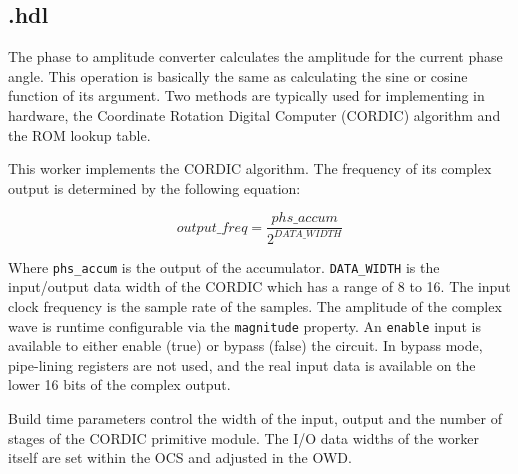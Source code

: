 \subsection*{\comp.hdl}
\begin{flushleft}
	The phase to amplitude converter calculates the amplitude for the current phase angle.  This operation is basically the same as calculating the sine or cosine function of its argument.  Two methods are typically used for implementing in hardware, the Coordinate Rotation Digital Computer (CORDIC) algorithm and the ROM lookup table.\medskip

	This worker implements the CORDIC algorithm. The frequency of its complex output is determined by the following equation:

	\begin{equation} \label{eq:output_freq}
		output\_freq = \frac{phs\_accum}{2^{DATA\_WIDTH}}
	\end{equation}

	Where \verb+phs_accum+ is the output of the accumulator. \verb+DATA_WIDTH+ is the input/output data width of the CORDIC which has a range of 8 to 16. The input clock frequency is the sample rate of the samples. The amplitude of the complex wave is runtime configurable via the \verb+magnitude+ property.  An \verb+enable+ input is available to either enable (true) or bypass (false) the circuit. In bypass mode, pipe-lining registers are not used, and the real input data is available on the lower 16 bits of the complex output.\medskip

	Build time parameters control the width of the input, output and the number of stages of the CORDIC primitive module. The I/O data widths of the worker itself are set within the OCS and adjusted in the OWD.
\end{flushleft}

